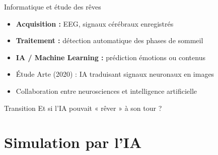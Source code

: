 \documentclass[aspectratio=169]{beamer}
\begin{document}
\begin{frame}{Informatique et étude des rêves}\label{informatique}

\begin{itemize}
  \item \textbf{Acquisition :} EEG, signaux cérébraux enregistrés
  
  \vspace{0.4cm}
  
  \item \textbf{Traitement :} détection automatique des phases de sommeil
  
  \vspace{0.4cm}
  \item \textbf{IA / Machine Learning :} prédiction émotions ou contenus
  
  \vspace{0.4cm}
  
  \item Étude Arte (2020) : IA traduisant signaux neuronaux en images
  
  \vspace{0.4cm}
  
  \item Collaboration entre neurosciences et intelligence artificielle
\end{itemize}

\vspace{0.8cm}

\begin{block}{Transition}
Et si l'IA pouvait « rêver » à son tour ?
\end{block}

\end{frame}
\section{Simulation par l'IA}
\end{document}
